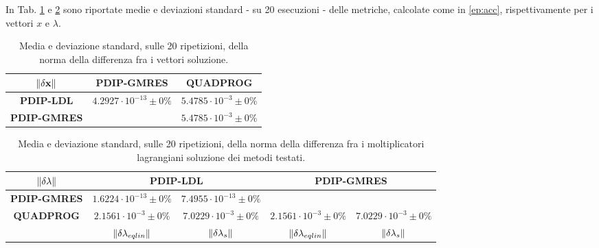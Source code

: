In Tab. \ref{tab:normx} e \ref{tab:norml} sono riportate medie e deviazioni standard - su 20 esecuzioni - delle metriche, calcolate come in \ref{ep:acc}, rispettivamente per i vettori $x$ e $\lambda$.   

\begin{table}[!h]
\centering
\begin{tabular}{c|c|l|c}
$\mathbf{\left\lVert\delta x\right\rVert}$ & \multicolumn{2}{c|}{\textbf{PDIP-GMRES}}         & \textbf{QUADPROG}          \\ \hline
\textbf{PDIP-LDL}            & \multicolumn{2}{c|}{$4.2927\cdot10^{-13}\pm0\%$} & $5.4785\cdot10^{-3}\pm0\%$ \\ \hline
\textbf{PDIP-GMRES}          & \multicolumn{2}{c|}{}                            & $5.4785\cdot10^{-3}\pm0\%$
\end{tabular}
\caption{Media e deviazione standard, sulle 20 ripetizioni, della norma della differenza fra i vettori soluzione.\label{tab:normx}}
\end{table}

\begin{table}[!h]
\begin{tabular}{c|c|c|c|c|}
      $\mathbf{\left\lVert\delta\lambda\right\rVert}$             & \multicolumn{2}{c|}{\textbf{PDIP-LDL}}                                        & \multicolumn{2}{c|}{\textbf{PDIP-GMRES}}                                      \\ \hline
\textbf{PDIP-GMRES} & $1.6224\cdot10^{-13}\pm0\%$          & $7.4955\cdot10^{-13}\pm0\%$         & \multicolumn{2}{c|}{ }                                                        \\ 
\textbf{QUADPROG}   & $2.1561\cdot10^{-3}\pm0\%$            & $7.0229\cdot10^{-3}\pm0\%$            & $2.1561\cdot10^{-3}\pm0\%$            & $7.0229\cdot10^{{-3}}\pm0\%$          \\
                    & $\left\lVert \delta\lambda_{eqlin} \right\rVert$ & $\left\lVert \delta\lambda_{s} \right\rVert$ & $\left\lVert \delta\lambda_{eqlin} \right\rVert$ & $\left\lVert \delta\lambda_{s} \right\rVert$
\end{tabular}
\caption{Media e deviazione standard, sulle 20 ripetizioni, della norma della differenza fra i moltiplicatori lagrangiani soluzione dei metodi testati.\label{tab:norml}}
\end{table}

